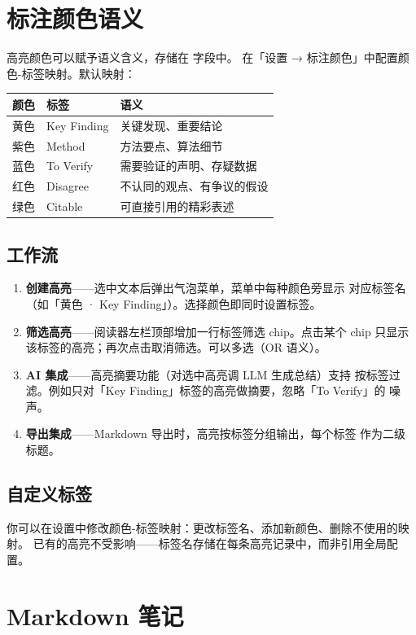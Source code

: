 \section{标注颜色语义}

高亮颜色可以赋予语义含义，存储在  字段中。
在「设置 → 标注颜色」中配置颜色-标签映射。默认映射：

\begin{longtable}{p{2cm} p{3.5cm} p{7cm}}
\toprule
\textbf{颜色} & \textbf{标签} & \textbf{语义} \\
\midrule
\endhead
黄色 & Key Finding & 关键发现、重要结论 \\
紫色 & Method & 方法要点、算法细节 \\
蓝色 & To Verify & 需要验证的声明、存疑数据 \\
红色 & Disagree & 不认同的观点、有争议的假设 \\
绿色 & Citable & 可直接引用的精彩表述 \\
\bottomrule
\end{longtable}

\subsection{工作流}

\begin{enumerate}
  \item \textbf{创建高亮}——选中文本后弹出气泡菜单，菜单中每种颜色旁显示
    对应标签名（如「黄色 · Key Finding」）。选择颜色即同时设置标签。
  \item \textbf{筛选高亮}——阅读器左栏顶部增加一行标签筛选 chip。点击某个
    chip 只显示该标签的高亮；再次点击取消筛选。可以多选（OR 语义）。
  \item \textbf{AI 集成}——高亮摘要功能（对选中高亮调 LLM 生成总结）支持
    按标签过滤。例如只对「Key Finding」标签的高亮做摘要，忽略「To Verify」的
    噪声。
  \item \textbf{导出集成}——Markdown 导出时，高亮按标签分组输出，每个标签
    作为二级标题。
\end{enumerate}

\subsection{自定义标签}

你可以在设置中修改颜色-标签映射：更改标签名、添加新颜色、删除不使用的映射。
已有的高亮不受影响——标签名存储在每条高亮记录中，而非引用全局配置。

\section{Markdown 笔记}

